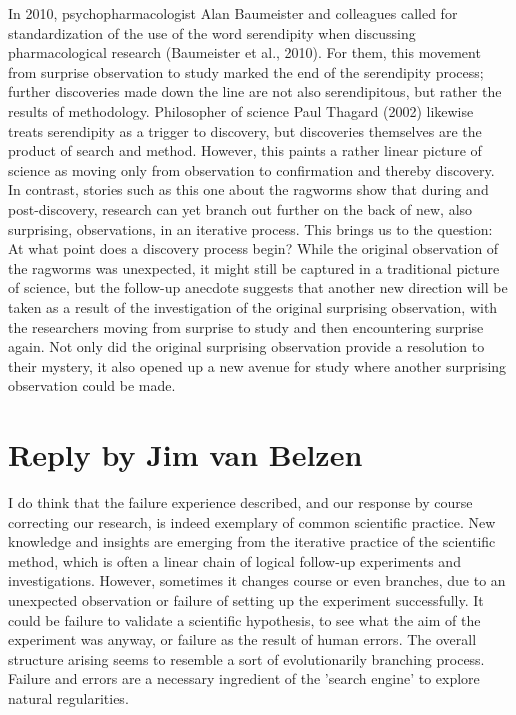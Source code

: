 \documentclass[authordate, commentary]{jote-new-article}
\begin{document}
	In 2010, psychopharmacologist Alan Baumeister and colleagues called for standardization of the use of the word serendipity when discussing pharmacological research (Baumeister et al., 2010). For them, this movement from surprise observation to study marked the end of the serendipity process; further discoveries made down the line are not also serendipitous, but rather the results of methodology. Philosopher of science Paul Thagard (2002) likewise treats serendipity as a trigger to discovery, but discoveries themselves are the product of search and method. However, this paints a rather linear picture of science as moving only from observation to confirmation and thereby discovery. In contrast, stories such as this one about the ragworms show that during and post-discovery, research can yet branch out further on the back of new, also surprising, observations, in an iterative process. This brings us to the question: At what point does a discovery process begin? While the original observation of the ragworms was unexpected, it might still be captured in a traditional picture of science, but the follow-up anecdote suggests that another new direction will be taken as a result of the investigation of the original surprising observation, with the researchers moving from surprise to study and then encountering surprise again. Not only did the original surprising observation provide a resolution to their mystery, it also opened up a new avenue for study where another surprising observation could be made.

\newpage

	\section{Reply by Jim van Belzen}



	I do think that the failure experience described, and our response by course correcting our research, is indeed exemplary of common scientific practice. New knowledge and insights are emerging from the iterative practice of the scientific method, which is often a linear chain of logical follow-up experiments and investigations. However, sometimes it changes course or even branches, due to an unexpected observation or failure of setting up the experiment successfully. It could be failure to validate a scientific hypothesis, to see what the aim of the experiment was anyway, or failure as the result of human errors. The overall structure arising seems to resemble a sort of evolutionarily branching process. Failure and errors are a necessary ingredient of the 'search engine' to explore natural regularities.
\end{document}
